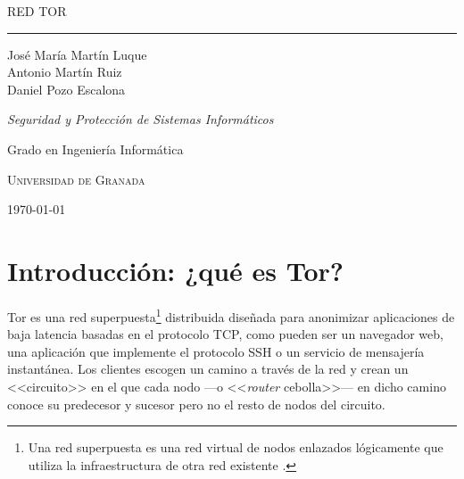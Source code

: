 \documentclass[
  a4paper,
  12pt,
  spanish,
]{scrartcl}
\DeclareRobustCommand{\spacedallcaps}[1]{{\linespread{1.3}\sacshape\MakeTextUppercase{#1}}}%
\newcommand{\horrule}[1]{\rule{\linewidth}{#1}}
\begin{document}
\begin{titlepage}
  \vspace*{4cm}

  \begin{flushleft}
    \Huge
    \spacedallcaps{Red Tor}
    \horrule{2pt}
  \end{flushleft}

  \vspace{2em}

  \begin{flushright}
    \large
    José María Martín Luque\\
    Antonio Martín Ruiz\\
    Daniel Pozo Escalona\vspace{1em}
  
    \textit{Seguridad y Protección de Sistemas Informáticos}
  
    Grado en Ingeniería Informática
  
    \textsc{Universidad de Granada}\vspace{1em}
  
    \today\vspace{.5em}
  \end{flushright}
\end{titlepage}

\newpage

{\hypersetup{hidelinks}
\tableofcontents
}

\newpage

\section{Introducción: ¿qué es Tor?}


Tor es una red superpuesta\footnote{
  Una red superpuesta es una red virtual de nodos enlazados lógicamente que utiliza la infraestructura de otra red existente \parencite[154]{kurose_computer_2013}.
} distribuida diseñada para anonimizar aplicaciones de baja latencia basadas en el protocolo TCP, como pueden ser un navegador web, una aplicación que implemente el protocolo SSH o un servicio de mensajería instantánea.
Los clientes escogen un camino a través de la red y crean un <<circuito>> en el que cada nodo ---o <<\textit{router} cebolla>>--- en dicho camino conoce su predecesor y sucesor pero no el resto de nodos del circuito.
\end{document}
